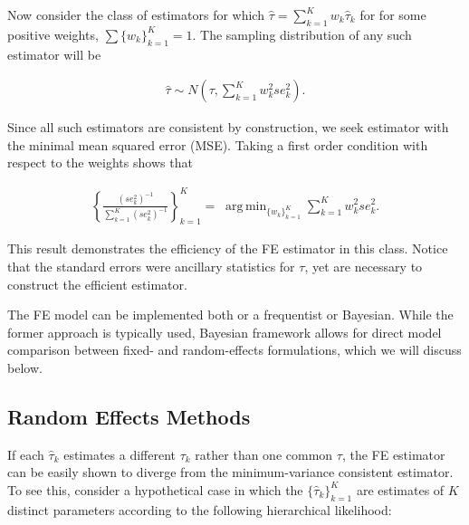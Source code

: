 \documentclass[12pt]{article}
\DeclareMathOperator*{\argmin}{arg\,min}
\begin{document}
Now consider the class of estimators for which $\hat{\tau} = \sum_{k=1}^{K} w_k \hat{\tau}_k$ for 
for some positive weights, $\sum \{w_k\}_{k=1}^K =1$.
The sampling distribution of any such estimator will be

\begin{equation}
\begin{aligned}
\hat{\tau} \sim N(\tau, \sum_{k=1}^{K} w_k^2 se^2_{k}) .
\end{aligned}
\end{equation}

Since all such estimators are consistent by construction, we seek estimator with the minimal mean squared error (MSE). Taking a first order condition with respect to the weights shows that

\begin{equation}\label{fe}
\begin{aligned}
\left\{ \frac{(se^2_k)^{-1}}{\sum_{k=1}^K(se^2_k)^{-1}} \right\}_{k=1}^K = \; \argmin_{ \{w_k\}_{k=1}^K  } \sum_{k=1}^{K} w_k^2 se^2_{k}.
\end{aligned}
\end{equation}

This result demonstrates the efficiency of the FE estimator in this class. Notice that the standard errors were ancillary statistics for $\tau$, yet are necessary to construct the efficient estimator. 

The FE model can be implemented both or a frequentist or Bayesian. While the former approach is typically used, Bayesian framework allows for direct model comparison between fixed- and random-effects formulations, which we will discuss below. 



\subsection{Random Effects Methods}


If each $\hat{\tau}_k$ estimates a different $\tau_k$ rather than one common $\tau$, the FE estimator can be easily shown to diverge from the minimum-variance consistent estimator. To see this, consider a hypothetical case in which the $\{\hat{\tau}_k\}_{k=1}^K$ are estimates of $K$ distinct parameters according to the following hierarchical likelihood:
\end{document}
